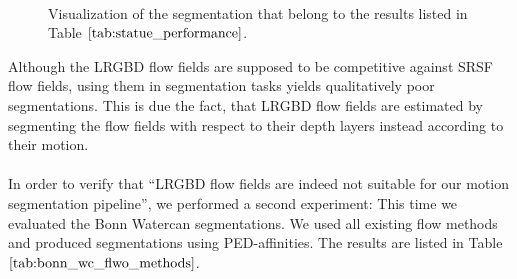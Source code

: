 \begin{figure}[H]
\begin{center}
~
\end{center}
\caption[Bonn Cerealbox Segmentations]{Visualization of the segmentation that belong to the results listed in Table $\ref{tab:statue_performance}$.}
\label{fig:alley_segmentations}
\end{figure}
Although the LRGBD flow fields are supposed to be competitive against SRSF flow fields, using them in segmentation tasks yields qualitatively poor segmentations. This is due the fact, that LRGBD flow fields are estimated by segmenting the flow fields with respect to their depth layers instead according to their motion. \\ \\
In order to verify that \enquote{LRGBD flow fields are indeed not suitable for our motion segmentation pipeline}, we performed a second experiment: This time we evaluated the Bonn Watercan segmentations. We used all existing flow methods and produced segmentations using PED-affinities. The results are listed in Table $\ref{tab:bonn_wc_flwo_methods}$.
